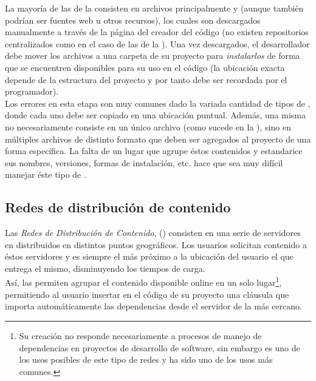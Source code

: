 La mayoría de las \dependencies de la \viewtier consisten en archivos 
principalmente \css y \js (aunque también podrían ser fuentes web u otros 
recursos), los cuales son descargados manualmente a través de la página del 
creador del código (no existen repositorios centralizados como en el caso de 
las \dependencies de la \logictier). Una vez descargados, el desarrollador debe 
mover los archivos a una carpeta de su proyecto para \emph{instalarlos} de 
forma que se encuentren disponibles para su uso en el código (la ubicación 
exacta depende de la estructura del proyecto y por tanto debe ser recordada por 
el programador).\\
Los errores en esta etapa son muy comunes dado la variada cantidad de tipos de
\dependency, donde cada uno debe ser copiado en una ubicación puntual. Además, 
una misma \dependency no necesariamente consiste en un único archivo (como 
sucede en la \logictier), sino en múltiples archivos de distinto formato que 
deben ser agregados al proyecto de una forma específica. La falta de un lugar 
que agrupe éstos contenidos y estandarice sus nombres, versiones, formas de 
instalación, etc. hace que sea muy difícil manejar éste tipo de \dependencies.

\subsection{Redes de distribución de contenido}
\label{subsec:depmgmnt:jvm_dev:cdns}

Las \emph{Redes de Distribución de Contenido}, (\cdn) consisten en una serie de 
servidores en \internet distribuidos en distintos puntos geográficos. Los 
usuarios solicitan contenido a éstos servidores y es siempre el más 
próximo a la ubicación del usuario el que entrega el mismo, disminuyendo los 
tiempos de carga.\\
Así, las \cdns permiten agrupar el contenido disponible online en un solo 
lugar\footnote{
	Su creación no responde necesariamente a procesos de manejo de dependencias
	en proyectos de desarrollo de software, sin embargo es uno de los usos
	posibles de este tipo de redes y ha sido uno de los usos más comunes.
}, permitiendo al usuario insertar en el código \html de su proyecto
una cláusula que importa automáticamente las dependencias desde el servidor de 
la \cdn más cercano.\\

